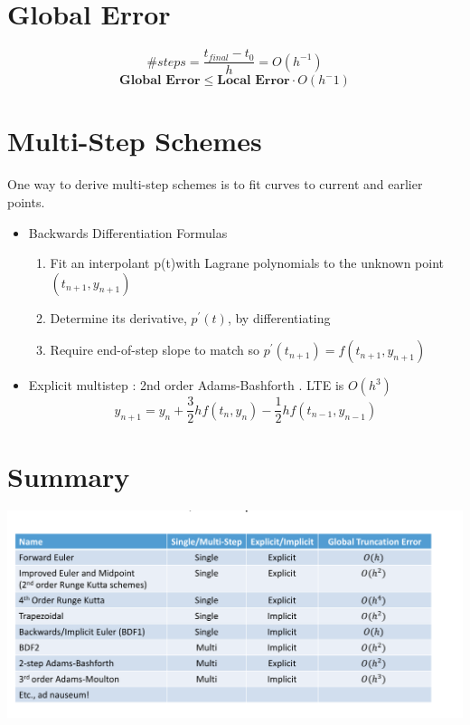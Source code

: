 \documentclass[twoside]{article}
\begin{document}
\section{Global Error}
$$ \# steps = \frac{t_{final} - t_0}{h} = O(h^{-1}) $$
$$ \textbf{Global Error} \leq \textbf{Local Error} \cdot O(h^-1)$$

\section{Multi-Step Schemes}
One way to derive multi-step schemes is to fit curves to current and earlier points.

\begin{itemize}
\item Backwards Differentiation Formulas 
\begin{enumerate}
\item Fit an interpolant p(t)with Lagrane polynomials to the unknown point \((t_{n+1}, y_{n+1})\)
\item Determine its derivative, \(p^\prime(t)\), by differentiating
\item Require end-of-step slope to match so \(p^\prime(t_{n+1}) = f (t_{n+1}, y_{n+1}) \) 
\end{enumerate}
\item Explicit multistep : 2nd order Adams-Bashforth . LTE is \(O(h^3)\)
$$ y_{n+1} = y_n + \frac{3}{2}h f(t_n, y_n) - \frac{1}{2} h f (t_{n-1}, y_{n-1})$$
\end{itemize}


\section{Summary}
\begin{center}
\includegraphics[scale=0.5]{2}
\end{center}
\end{document}
